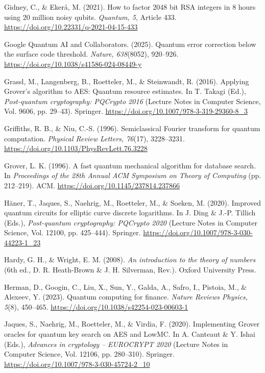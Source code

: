 \documentclass[12pt,oneside]{report}
\begin{document}
Gidney, C., \& Ekerå, M. (2021). How to factor 2048 bit RSA integers in 8 hours using 20 million noisy qubits. \textit{Quantum, 5}, Article 433. \url{https://doi.org/10.22331/q-2021-04-15-433}
\par

Google Quantum AI and Collaborators. (2025). Quantum error correction below the surface code threshold. \textit{Nature, 638}(8052), 920–926. \url{https://doi.org/10.1038/s41586-024-08449-y}
\par

Grassl, M., Langenberg, B., Roetteler, M., \& Steinwandt, R. (2016). Applying Grover's algorithm to AES: Quantum resource estimates. In T. Takagi (Ed.), \textit{Post-quantum cryptography: PQCrypto 2016} (Lecture Notes in Computer Science, Vol. 9606, pp. 29–43). Springer. \url{https://doi.org/10.1007/978-3-319-29360-8_3}
\par

Griffiths, R. B., \& Niu, C.-S. (1996). Semiclassical Fourier transform for quantum computation. \textit{Physical Review Letters, 76}(17), 3228–3231. \url{https://doi.org/10.1103/PhysRevLett.76.3228}
\par

Grover, L. K. (1996). A fast quantum mechanical algorithm for database search. In \textit{Proceedings of the 28th Annual ACM Symposium on Theory of Computing} (pp. 212–219). ACM. \url{https://doi.org/10.1145/237814.237866}
\par

Häner, T., Jaques, S., Naehrig, M., Roetteler, M., \& Soeken, M. (2020). Improved quantum circuits for elliptic curve discrete logarithms. In J. Ding \& J.-P. Tillich (Eds.), \textit{Post-quantum cryptography: PQCrypto 2020} (Lecture Notes in Computer Science, Vol. 12100, pp. 425–444). Springer. \url{https://doi.org/10.1007/978-3-030-44223-1_23}
\par

Hardy, G. H., \& Wright, E. M. (2008). \textit{An introduction to the theory of numbers} (6th ed., D. R. Heath-Brown \& J. H. Silverman, Rev.). Oxford University Press.
\par

Herman, D., Googin, C., Liu, X., Sun, Y., Galda, A., Safro, I., Pistoia, M., \& Alexeev, Y. (2023). Quantum computing for finance. \textit{Nature Reviews Physics, 5}(8), 450–465. \url{https://doi.org/10.1038/s42254-023-00603-1}
\par

Jaques, S., Naehrig, M., Roetteler, M., \& Virdia, F. (2020). Implementing Grover oracles for quantum key search on AES and LowMC. In A. Canteaut \& Y. Ishai (Eds.), \textit{Advances in cryptology – EUROCRYPT 2020} (Lecture Notes in Computer Science, Vol. 12106, pp. 280–310). Springer. \url{https://doi.org/10.1007/978-3-030-45724-2_10}
\par
\end{document}
